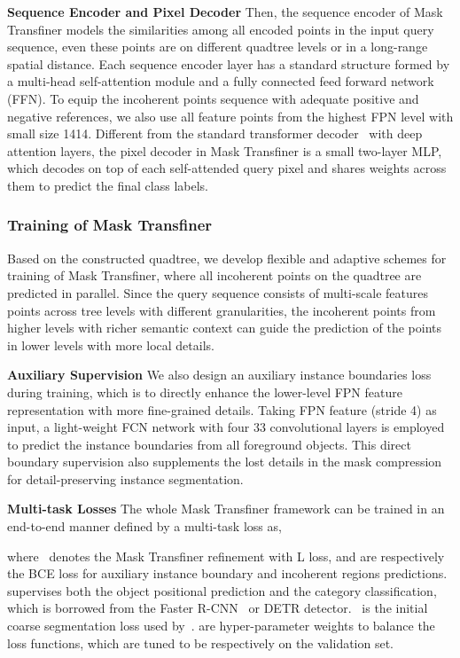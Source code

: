 \documentclass[10pt,twocolumn,letterpaper]{article}
\newcommand{\parsection}[1]{\vspace{1mm}\noindent\textbf{#1}}
\begin{document}
\parsection{Sequence Encoder and Pixel Decoder} 
Then, the sequence encoder of Mask Transfiner models the similarities among all encoded points in the input query sequence, even these points are on different quadtree levels or in a long-range spatial distance. Each sequence encoder layer has a standard structure formed by a multi-head self-attention module and a fully connected feed forward network (FFN). To equip the incoherent points sequence with adequate positive and negative references, we also use all feature points from the highest FPN level with small size 1414. Different from the standard transformer decoder~\cite{carion2020end} with deep attention layers, the pixel decoder in Mask Transfiner is a small two-layer MLP, which decodes on top of each self-attended query pixel and shares weights across them to predict the final class labels.

\subsubsection{Training of Mask Transfiner}
\label{refinement} 

Based on the constructed quadtree, we develop flexible and adaptive schemes for training of Mask Transfiner, where all incoherent points on the quadtree are predicted in parallel. Since the query sequence consists of multi-scale features points across tree levels with different granularities, the incoherent points from higher levels with richer semantic context can guide the prediction of the points in lower levels with more local details. 

\parsection{Auxiliary Supervision}
We also design an auxiliary instance boundaries loss during training, which is to directly enhance the lower-level FPN feature representation with more fine-grained details. Taking  FPN feature (stride 4) as input, a light-weight FCN network with four 33 convolutional layers is employed to predict the instance boundaries from all foreground objects. This direct boundary supervision also supplements the lost details in the mask compression for detail-preserving instance segmentation.

\parsection{Multi-task Losses} The whole Mask Transfiner framework can be trained in an end-to-end manner defined by a multi-task loss as,


\vspace{-0.2in}

where~ denotes the Mask Transfiner refinement with L loss,  and  are respectively the BCE loss for auxiliary instance boundary and incoherent regions predictions.~ supervises both the object positional prediction and the category classification, which is  borrowed from the Faster R-CNN~\cite{tian2019fcos} or DETR detector.~ is the initial coarse segmentation loss used by~\cite{he2017mask}.  are hyper-parameter weights to balance the loss functions, which are tuned to be  respectively on the validation set. 
\end{document}
